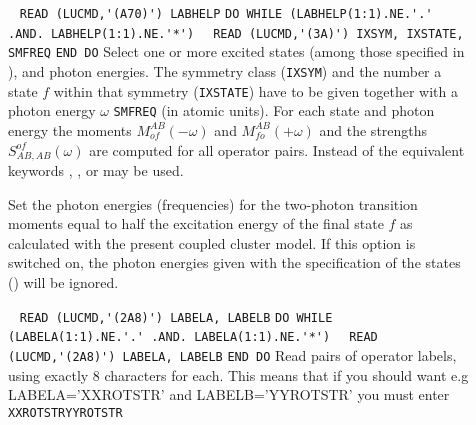 \begin{description}
%
\item[] \verb| | \newline
\verb|READ (LUCMD,'(A70)') LABHELP|\newline
\verb|DO WHILE (LABHELP(1:1).NE.'.' .AND. LABHELP(1:1).NE.'*')|\newline
\verb|  READ (LUCMD,'(3A)') IXSYM, IXSTATE, SMFREQ|\newline
\verb|END DO| \newline
Select one or more excited states (among those specified
in ), and photon energies.
The symmetry class (\verb+IXSYM+) and the number a state $f$
within that symmetry (\verb+IXSTATE+) have to be given
together with a photon energy $\omega$ \verb+SMFREQ+ (in atomic units).
For each state and photon energy the moments 
$M^{AB}_{of}(-\omega)$ and $M^{AB}_{fo}(+\omega)$ and the
strengths $S^{of}_{AB,AB}(\omega)$ are computed for all operator pairs.
Instead of  the equivalent keywords ,
, or  may be used.
%
\item[] 
Set the photon energies (frequencies) for the two-photon transition moments
equal to  half the excitation energy of the final state $f$
as calculated with the present coupled cluster model.
If this option is switched on, the photon energies given with the
specification of the states () will be ignored.
%
\item[] \verb| |\newline
\verb|READ (LUCMD,'(2A8)') LABELA, LABELB|\newline
\verb|DO WHILE (LABELA(1:1).NE.'.' .AND. LABELA(1:1).NE.'*')|\newline
\verb|  READ (LUCMD,'(2A8)') LABELA, LABELB|\newline
\verb|END DO|\newline
Read pairs of operator labels, using exactly 8 characters for each. 
This means that if you should want e.g LABELA='XXROTSTR' and LABELB='YYROTSTR'
you must enter\newline
\verb|XXROTSTRYYROTSTR|


\end{description}

